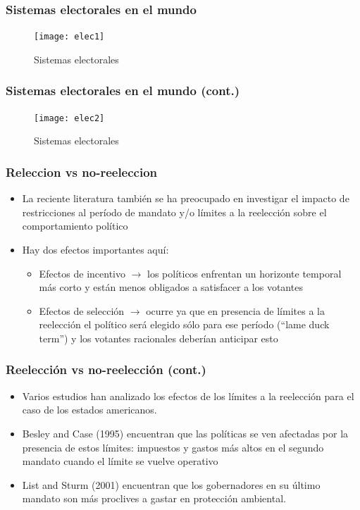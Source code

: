 \documentclass[handout,final,xcolor=dvipsnames]{beamer}
\begin{document}
\begin{frame}\frametitle{Sistemas electorales en el mundo}
  \begin{figure}[htbp]
    \centering \vspace{-5.5cm}
    \texttt{[image: elec1]}
    \caption{Sistemas electorales}
    \label{fig:elec1}
  \end{figure}
\end{frame}


\begin{frame}\frametitle{Sistemas electorales en el mundo (cont.)}
  \begin{figure}[htbp]
    \centering \vspace{-5.5cm}
    \texttt{[image: elec2]}
    \caption{Sistemas electorales}
    \label{fig:elec1}
  \end{figure}
\end{frame}


\begin{frame}\frametitle{Releccion vs no-reeleccion}
\begin{itemize}\itemsep 15pt
\item La reciente literatura también se ha preocupado en investigar el impacto de restricciones
al período de mandato y/o límites a la reelección sobre el comportamiento político
\item Hay dos efectos importantes aquí:
\begin{itemize}\itemsep 15pt \medskip 
\item Efectos de incentivo $\longrightarrow$ los políticos enfrentan un horizonte temporal más corto y
están menos obligados a satisfacer a los votantes
\item Efectos de selección $\longrightarrow$ ocurre ya que en presencia de límites a la reelección
el político será elegido sólo para ese período (``lame duck term'') y los votantes
racionales deberían anticipar esto
\end{itemize}
\end{itemize}
\end{frame}

\begin{frame}\frametitle{Reelección vs no-reelección (cont.)}
\begin{itemize}\itemsep 15pt 
\item Varios estudios han analizado los efectos de los límites a la reelección para el caso de
los estados americanos.
\item Besley and Case (1995) encuentran que las políticas se ven afectadas por la presencia
de estos límites: impuestos y gastos más altos en el segundo mandato cuando el límite
se vuelve operativo
\item List and Sturm (2001) encuentran que los gobernadores en su último mandato son más
proclives a gastar en protección ambiental.
\end{itemize}
\end{frame}
\end{document}
